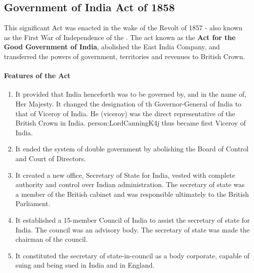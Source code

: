 \subsection*{Government of India Act of 1858}

This significant Act was enacted in the wake of the Revolt of 1857 - also known as the First War of Independence of the . The act known as the \textbf{Act for the Good Government of India}, abolished the East India Company, and transferred the powers of government, territories and revenues to British Crown.

\paragraph{Features of the Act}
\begin{enumerate}
  \item It provided that India henceforth was to be governed by, and in the name of, Her Majesty. It changed the designation of th Governor-General of India to that of Viceroy of India. He (viceroy) was the direct representative of the British Crown in India. \gls{person:LordCanningK4j} thus became first Viceroy of India.
  \item It ended the system of double government by abolishing the Board of Control and Court of Directors.
  \item It created a new office, Secretary of State for India, vested with complete authority and control over Indian administration. The secretary of state was a member of the British cabinet and was responsible ultimately to the British Parliament.
  \item It established a 15-member Council of India to assist the secretary of state for India. The council was an advisory body. The secretary of state was made the chairman of the council.
  \item It constituted the secretary of state-in-council as a body corporate, capable of suing and being sued in India and in England.
\end{enumerate}




